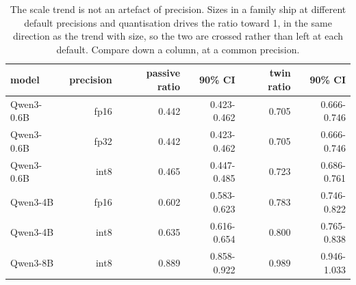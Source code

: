 \begin{table}[t]
\centering
\small
\caption{The scale trend is not an artefact of precision. Sizes in a family ship at different default precisions and quantisation drives the ratio toward 1, in the same direction as the trend with size, so the two are crossed rather than left at each default. Compare down a column, at a common precision.}
\begin{tabular}{lrrrrr}
\toprule
model & precision & passive ratio & 90\% CI & twin ratio & 90\% CI \\
\midrule
Qwen3-0.6B & fp16 & 0.442 & 0.423-0.462 & 0.705 & 0.666-0.746 \\
Qwen3-0.6B & fp32 & 0.442 & 0.423-0.462 & 0.705 & 0.666-0.746 \\
Qwen3-0.6B & int8 & 0.465 & 0.447-0.485 & 0.723 & 0.686-0.761 \\
Qwen3-4B & fp16 & 0.602 & 0.583-0.623 & 0.783 & 0.746-0.822 \\
Qwen3-4B & int8 & 0.635 & 0.616-0.654 & 0.800 & 0.765-0.838 \\
Qwen3-8B & int8 & 0.889 & 0.858-0.922 & 0.989 & 0.946-1.033 \\
\bottomrule
\end{tabular}
\end{table}
